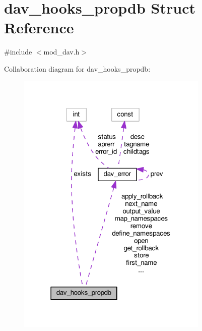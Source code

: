 \hypertarget{structdav__hooks__propdb}{}\section{dav\+\_\+hooks\+\_\+propdb Struct Reference}
\label{structdav__hooks__propdb}


{\ttfamily \#include $<$mod\+\_\+dav.\+h$>$}



Collaboration diagram for dav\+\_\+hooks\+\_\+propdb\+:
\nopagebreak
\begin{figure}[H]
\begin{center}
\leavevmode
\includegraphics[width=259pt]{structdav__hooks__propdb__coll__graph}
\end{center}
\end{figure}
